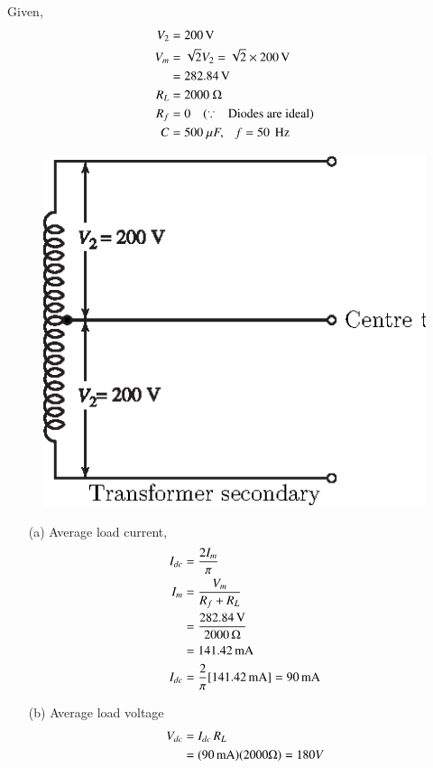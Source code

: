 \begin{solution}
Given,
\begin{align*}
V_2 & = 200 \operatorname{\mathrm{V}}\\
V_m & = \sqrt{2} V_2=\sqrt{2}\times 200\text{\,V}\\
& = 282.84 \operatorname{\mathrm{V}}\\
R_L & = 2000 ~\Omega\\
R_f & = 0 \quad (\because \text{ ~ Diodes are ideal})\\
C & = 500 ~ \mu F, ~~~ f= 50 ~\operatorname{Hz}
\end{align*}
\begin{figure}[H]
\centering
\includegraphics{chap2/add-fig/S3-EE-02-IN004.eps}
\end{figure}

\begin{itemize}
\item[(a)] Average load current,
\begin{align*}
I_{dc} & = \frac{2I_m}{\pi}\\ 
I_m & = \frac{V_m}{R_f + R_L}\\
& = \frac{282.84 \operatorname{\mathrm{V}}}{2000\,\Omega}\\
& = 141.42\text{\,mA}\\
I_{dc} & = \frac{2}{\pi} [141.42 \operatorname{mA}] = 90 \operatorname{mA}\\
\end{align*}

\item[(b)] Average load voltage
\begin{align*}
V_{dc} & = I_{dc}\,R_L\\
& = (90 \operatorname{mA}) (2000 \Omega) = 180 V
\end{align*}


\end{itemize}
\end{solution}
